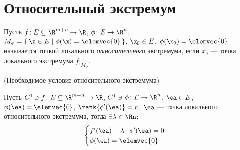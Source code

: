 \section{Относительный экстремум}

\begin{definition}
    Пусть $f \colon E \subseteq \R^{m + n} \to \R$, $\phi \colon E \to \R^n$,
    $M_{\phi} = \{\,\x \in E \mid \phi(\x) = \elemvec{0}\,\}$, $\x_0 \in E$, $\phi(\x_0) =
    \elemvec{0}$ называется точкой локального \textit{относительного} экстремума, если
    $x_0$ --- точка локального экстремума $f\big|_{M_{\phi}}$.
\end{definition}

\begin{theorem}(Необходимое условие относительного экстремума)

    Пусть $C^1 \ni f \colon E \subseteq \R^{m + n} \to \R$, $C^1 \ni \phi \colon
    E \to \R^n$, $\ea \in E$, $\phi(\ea) = \elemvec{0}$, $\rank{\phi'(\ea)} = n$,
    $\ea$ --- точка локального относительного экстремума, тогда $\exists \lambda \in \Rn
    \colon$
\[
    \begin{cases}
        f'(\ea) - \lambda \cdot \phi'(\ea) = 0 \\
        \phi(\ea) = \elemvec{0}
    \end{cases}
\]
\end{theorem}
